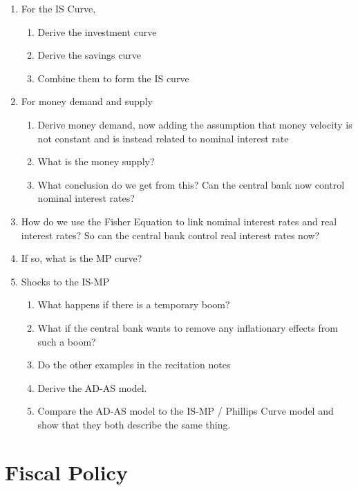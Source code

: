 \documentclass[11pt]{scrartcl}
\begin{document}
\begin{enumerate}
\item For the IS Curve,
\begin{enumerate}
\item Derive the investment curve
\item Derive the savings curve
\item Combine them to form the IS curve
\end{enumerate}
\item For money demand and supply
\begin{enumerate}
\item Derive money demand, now adding the assumption that money velocity is not constant and is instead related to nominal interest rate
\item What is the money supply?
\item What conclusion do we get from this? Can the central bank now control nominal interest rates?
\end{enumerate}
\item How do we use the Fisher Equation to link nominal interest rates and real interest rates? So can the central bank control real interest rates now?
\item If so, what is the MP curve?
\item Shocks to the IS-MP
\begin{enumerate}
\item What happens if there is a temporary boom?
\item What if the central bank wants to remove any inflationary effects from such a boom?
\item Do the other examples in the recitation notes
\item Derive the AD-AS model.
\item Compare the AD-AS model to the IS-MP / Phillips Curve model and show that they both describe the same thing.
\end{enumerate}
\end{enumerate}

\section{Fiscal Policy}
\end{document}
